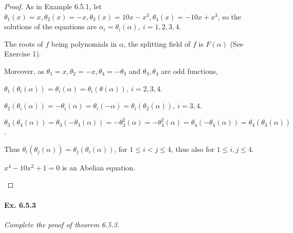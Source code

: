 \documentclass[11pt,a4paper]{article}
\begin{document}
\begin{proof}
As in Example 6.5.1, let $\theta_1(x) = x, \theta_2(x) = -x, \theta_3(x) = 10x-x^3,\theta_4(x) = -10x+x^3$, so the solutions of the equations are $\alpha_i = \theta_i(\alpha), \ i=1,2,3,4$.

The roots of $f$ being polynomials in $\alpha$, the splitting field of $f$ is $F(\alpha)$ (See  Exercise 1).

Moreover, as $\theta_1 = x, \theta_2 = -x, \theta_4 = -\theta_3$ and $\theta_3,\theta_4$ are odd functions,

 $\theta_1(\theta_i(\alpha)) = \theta_i(\alpha) = \theta_i(\theta(\alpha)),\ i=2,3,4$.

$\theta_2(\theta_i(\alpha)) = - \theta_i(\alpha) = \theta_i(-\alpha) = \theta_i(\theta_2(\alpha)),\ i=3,4$.

$\theta_3(\theta_4(\alpha)) = \theta_3(-\theta_3(\alpha)) = -\theta_3^2(\alpha) = -\theta_4^2(\alpha) = \theta_4(-\theta_4(\alpha)) = \theta_4(\theta_3(\alpha))$.

Thus $\theta_i(\theta_j(\alpha)) = \theta_j(\theta_i(\alpha))$, for $1\leq i <j\leq 4$, thus also for $1\leq i,j\leq 4$.
\begin{center}
$x^4-10x^2+1 = 0$ is an Abelian equation.
\end{center}
\end{proof}

\paragraph{Ex. 6.5.3}

{\it Complete the proof of theorem 6.5.3.
}
\end{document}

